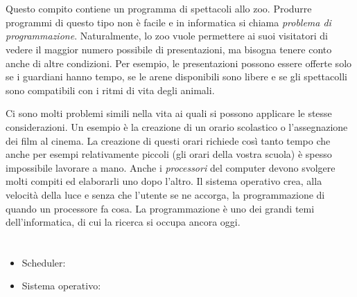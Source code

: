 {{%
\section*{\BrochureItsInformatics}
Questo compito contiene un programma di spettacoli allo zoo. Produrre programmi di questo tipo non è facile e in informatica si chiama \emph{problema di programmazione}. Naturalmente, lo zoo vuole permettere ai suoi visitatori di vedere il maggior numero possibile di presentazioni, ma bisogna tenere conto anche di altre condizioni. Per esempio, le presentazioni possono essere offerte solo se i guardiani hanno tempo, se le arene disponibili sono libere e se gli spettacolli sono compatibili con i ritmi di vita degli animali.

Ci sono molti problemi simili nella vita ai quali si possono applicare le stesse considerazioni. Un esempio è la creazione di un orario scolastico o l’assegnazione dei film al cinema. La creazione di questi orari richiede così tanto tempo che anche per esempi relativamente piccoli (gli orari della vostra scuola) è spesso impossibile lavorare a mano. Anche i \emph{processori} del computer devono svolgere molti compiti ed elaborarli uno dopo l’altro. Il sistema operativo crea, alla velocità della luce e senza che l’utente se ne accorga, la programmazione di quando un processore fa cosa. La programmazione è uno dei grandi temi dell’informatica, di cui la ricerca si occupa ancora oggi.



\section*{\BrochureWebsitesAndKeywords}
{\raggedright
\begin{itemize}
  \item Scheduler: \href{https://it.wikipedia.org/wiki/Scheduler}{}
  \item Sistema operativo: \href{https://it.wikipedia.org/wiki/Sistema_operativo}{}
\end{itemize}


}

}{}

}
